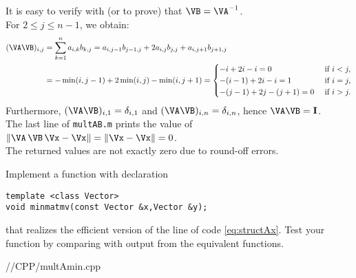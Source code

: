 \begin{problem}
\begin{subproblem}[2]
\begin{solution}
It is easy to verify with \Matlab (or to prove) that $\VB=\VA^{-1}$.\\
For $2 \leq j \leq n-1$, we obtain:
%
\begin{equation*}
\begin{aligned}
(\VA\VB)_{i,j} &= \sum_{k=1}^n a_{i,k} b_{k,j}
= a_{i,j-1} b_{j-1,j} + 2 a_{i,j} b_{j,j} + a_{i,j+1} b_{j+1,j} \\
&= -\min(i,j-1) + 2 \min(i,j) - \min(i,j+1)
= \begin{cases}
-i + 2i - i = 0 & \text{ if } i<j, \\
-(i-1) + 2i - i = 1 & \text{ if } i=j, \\
-(j-1) + 2j - (j+1) = 0 & \text{ if } i>j.
\end{cases}
\end{aligned}
\end{equation*}
%
Furthermore, $(\VA\VB)_{i,1} = \delta_{i,1}$ and $(\VA\VB)_{i,n} = \delta_{i,n}$, hence $\VA\VB = {\bf I}$.\\
The last line of \texttt{multAB.m} prints the value of $\|\VA\,\VB\,\Vx-\Vx\|=\|\Vx-\Vx\|=0$.\\
The returned values are not exactly zero due to round-off errors.

\end{solution}
\end{subproblem}

\begin{subproblem}[2] \label{sp:smv:cpp1}
  Implement a \Cpp{} function with declaration
\begin{lstlisting}
template <class Vector>
void minmatmv(const Vector &x,Vector &y);
\end{lstlisting}
that realizes the efficient version of the \matlab{} line of
code \eqref{eq:structAx}. Test your function by comparing
with output from the equivalent \matlab{} functions.

  \begin{solution}

 
{\problems/\chpt/CPP/multAmin.cpp}

  \end{solution}

\end{subproblem}

\end{problem}

%
